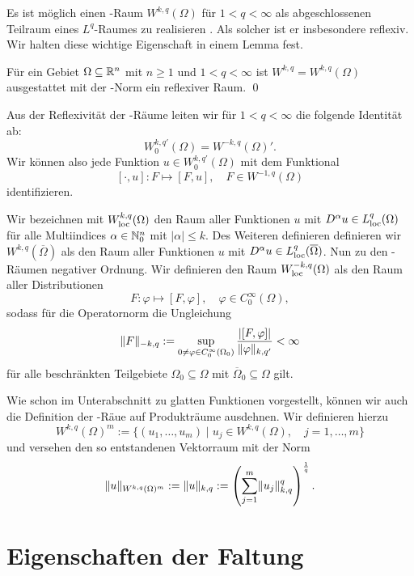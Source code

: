Es ist möglich einen \sobolev\hyp{}Raum $W^{k,q}(\Omega)$ für $1 < q < \infty$ als abgeschlossenen Teilraum eines $L^q$\hyp{}Raumes zu realisieren \cite[S.61, 3.5]{adams2003sobolev}.
Als solcher ist er insbesondere reflexiv.
Wir halten diese wichtige Eigenschaft in einem Lemma fest.

\begin{lem}
  Für ein Gebiet $\Omega \subseteq \mathbb{R}^n$ mit $n \geq 1$ und $1 < q < \infty$ ist $W^{k,q} = W^{k,q}(\Omega)$ ausgestattet mit der \sobolev\hyp{}Norm ein reflexiver Raum. \qed
\end{lem}

Aus der Reflexivität der \sobolev\hyp{}Räume leiten wir für $1 < q < \infty$ die folgende Identität ab:
$$
  W_0^{k,q'}(\Omega) = W^{-k,q}(\Omega)'.
$$
Wir können also jede Funktion $u \in W_0^{k,q'}(\Omega)$ mit dem Funktional
$$
[\cdot, u] \colon F \mapsto [F, u], \quad F \in W^{-1,q}(\Omega)
$$
identifizieren.

Wir bezeichnen mit $W^{k,q}_{\operatorname{loc}}(\Omega)$ den Raum aller Funktionen $u$ mit $D^\alpha u \in L^q_{\operatorname{loc}}(\Omega)$ für alle Multiindices $\alpha \in \mathbb{N}_0^n$ mit $|\alpha| \leq k$.
Des Weiteren definieren definieren wir $W^{k,q}(\overline\Omega)$ als den Raum aller Funktionen $u$ mit $D^\alpha u \in L^q_{\operatorname{loc}}(\overline\Omega)$.
Nun zu den \sobolev\hyp{}Räumen negativer Ordnung. 
Wir definieren den Raum $W^{-k,q}_{\operatorname{loc}}(\Omega)$ als den Raum aller Distributionen
$$
F \colon \varphi \mapsto [F,\varphi], \quad \varphi \in C_0^\infty(\Omega),
$$
sodass für die Operatornorm die Ungleichung
$$
\lVert F \rVert_{-k,q} := \sup_{0 \neq \varphi \in C_0^\infty(\Omega_0)}  \frac{|[F,\varphi]|}{\lVert \varphi \rVert_{k,q'}} < \infty
$$
für alle beschränkten Teilgebiete $\Omega_0 \subseteq \Omega$ mit $\overline\Omega_0 \subseteq \Omega$ gilt.

Wie schon im Unterabschnitt zu glatten Funktionen vorgestellt, können wir auch die Definition der \sobolev\hyp{}Räue auf Produkträume ausdehnen. 
Wir definieren hierzu
$$
W^{k,q}(\Omega)^m := \{ (u_1,\dots,u_m) \mid u_j \in W^{k,q}(\Omega), \quad j = 1,\dots, m\}
$$
und versehen den so entstandenen Vektorraum mit der Norm
$$
\lVert u \rVert_{W^{k,q}(\Omega)^m} 
:= \lVert u \rVert_{k,q}
:= \left( \sum_{j = 1}^m \lVert u_j \rVert_{k,q}^q \right)^{\frac{1}{q}}.
$$


\section{Eigenschaften der Faltung}
\label{subsec:mollification}

